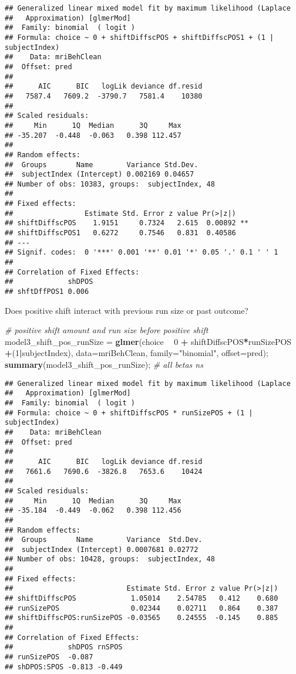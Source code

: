 \documentclass[]{article}
\newenvironment{Shaded}{\begin{snugshade}}{\end{snugshade}}
\newcommand{\CommentTok}[1]{\textcolor[rgb]{0.56,0.35,0.01}{\textit{#1}}}
\newcommand{\DataTypeTok}[1]{\textcolor[rgb]{0.13,0.29,0.53}{#1}}
\newcommand{\DecValTok}[1]{\textcolor[rgb]{0.00,0.00,0.81}{#1}}
\newcommand{\KeywordTok}[1]{\textcolor[rgb]{0.13,0.29,0.53}{\textbf{#1}}}
\newcommand{\NormalTok}[1]{#1}
\newcommand{\OperatorTok}[1]{\textcolor[rgb]{0.81,0.36,0.00}{\textbf{#1}}}
\newcommand{\StringTok}[1]{\textcolor[rgb]{0.31,0.60,0.02}{#1}}
\begin{document}
\begin{verbatim}
## Generalized linear mixed model fit by maximum likelihood (Laplace
##   Approximation) [glmerMod]
##  Family: binomial  ( logit )
## Formula: choice ~ 0 + shiftDiffscPOS + shiftDiffscPOS1 + (1 | subjectIndex)
##    Data: mriBehClean
##  Offset: pred
## 
##      AIC      BIC   logLik deviance df.resid 
##   7587.4   7609.2  -3790.7   7581.4    10380 
## 
## Scaled residuals: 
##     Min      1Q  Median      3Q     Max 
## -35.207  -0.448  -0.063   0.398 112.457 
## 
## Random effects:
##  Groups       Name        Variance Std.Dev.
##  subjectIndex (Intercept) 0.002169 0.04657 
## Number of obs: 10383, groups:  subjectIndex, 48
## 
## Fixed effects:
##                 Estimate Std. Error z value Pr(>|z|)   
## shiftDiffscPOS    1.9151     0.7324   2.615  0.00892 **
## shiftDiffscPOS1   0.6272     0.7546   0.831  0.40586   
## ---
## Signif. codes:  0 '***' 0.001 '**' 0.01 '*' 0.05 '.' 0.1 ' ' 1
## 
## Correlation of Fixed Effects:
##             shDPOS
## shftDffPOS1 0.006
\end{verbatim}

Does positive shift interact with previous run size or past outcome?

\begin{Shaded}
\begin{Highlighting}[]
\CommentTok{# positive shift amount and run size before positive shift}
\NormalTok{model3_shift_pos_runSize =}\StringTok{ }\KeywordTok{glmer}\NormalTok{(choice }\OperatorTok{~}\StringTok{ }\DecValTok{0} \OperatorTok{+}\StringTok{ }\NormalTok{shiftDiffscPOS}\OperatorTok{*}\NormalTok{runSizePOS }\OperatorTok{+}\NormalTok{(}\DecValTok{1}\OperatorTok{|}\NormalTok{subjectIndex), }\DataTypeTok{data=}\NormalTok{mriBehClean, }\DataTypeTok{family=}\StringTok{"binomial"}\NormalTok{, }\DataTypeTok{offset=}\NormalTok{pred);}
\KeywordTok{summary}\NormalTok{(model3_shift_pos_runSize); }\CommentTok{# all betas ns}
\end{Highlighting}
\end{Shaded}

\begin{verbatim}
## Generalized linear mixed model fit by maximum likelihood (Laplace
##   Approximation) [glmerMod]
##  Family: binomial  ( logit )
## Formula: choice ~ 0 + shiftDiffscPOS * runSizePOS + (1 | subjectIndex)
##    Data: mriBehClean
##  Offset: pred
## 
##      AIC      BIC   logLik deviance df.resid 
##   7661.6   7690.6  -3826.8   7653.6    10424 
## 
## Scaled residuals: 
##     Min      1Q  Median      3Q     Max 
## -35.184  -0.449  -0.062   0.398 112.456 
## 
## Random effects:
##  Groups       Name        Variance  Std.Dev.
##  subjectIndex (Intercept) 0.0007681 0.02772 
## Number of obs: 10428, groups:  subjectIndex, 48
## 
## Fixed effects:
##                           Estimate Std. Error z value Pr(>|z|)
## shiftDiffscPOS             1.05014    2.54785   0.412    0.680
## runSizePOS                 0.02344    0.02711   0.864    0.387
## shiftDiffscPOS:runSizePOS -0.03565    0.24555  -0.145    0.885
## 
## Correlation of Fixed Effects:
##             shDPOS rnSPOS
## runSizePOS  -0.087       
## shDPOS:SPOS -0.813 -0.449
\end{verbatim}
\end{document}
